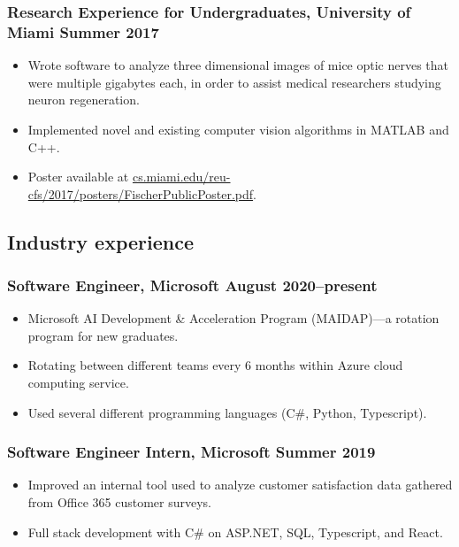 \documentclass{article}
\begin{document}
		\subsubsection*{Research Experience for Undergraduates, University of Miami \hfill \normalfont \normalsize Summer 2017}
			\begin{itemize}
				\item Wrote software to analyze three dimensional images of mice optic nerves that were multiple gigabytes each, in order to assist medical researchers studying neuron regeneration.
				\item Implemented novel and existing computer vision algorithms in MATLAB and C++.
				\item Poster available at \href{http://cs.miami.edu/reu-cfs/2017/posters/FischerPublicPoster.pdf}{cs.miami.edu/reu-cfs/2017/posters/FischerPublicPoster.pdf}.
			\end{itemize}
	
	\subsection*{Industry experience}
		\subsubsection*{Software Engineer, Microsoft \hfill \normalfont \normalsize August 2020--present}
		\begin{itemize}
			\item Microsoft AI Development \& Acceleration Program (MAIDAP)---a rotation program for new graduates.
			\item Rotating between different teams every 6 months within Azure cloud computing service.
			\item Used several different programming languages (C\#, Python, Typescript).
		\end{itemize}
		\subsubsection*{Software Engineer Intern, Microsoft \hfill \normalfont \normalsize Summer 2019}
		\begin{itemize}
			\item Improved an internal tool used to analyze customer satisfaction data gathered from Office 365 customer surveys.
			\item Full stack development with C\# on ASP.NET, SQL, Typescript, and React.
		\end{itemize}
\end{document}

